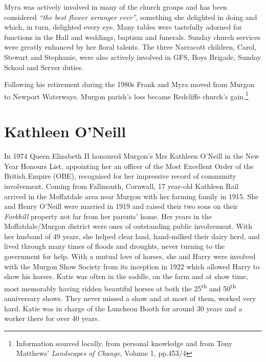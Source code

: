 Myra was actively involved in many of the church groups and has been considered \emph{``the best flower arranger ever''}, something she delighted in doing and which, in turn, delighted every eye. Many tables were tastefully adorned for functions in the Hall and weddings, baptism and funerals. Sunday church services were greatly enhanced by her floral talents. The three Narracott children, Carol, Stewart and Stephanie, were also actively involved in GFS, Boys Brigade, Sunday School and Server duties.



Following his retirement during the 1980s Frank and Myra moved from Murgon to Newport Waterways. Murgon parish's loss became Redcliffe church's gain.\footnote{Information sourced locally, from personal knowledge and from Tony Matthews' \emph{Landscapes of Change}, Volume 1, pp.453/4}


\section{Kathleen O'Neill}



In 1974 Queen Elizabeth II honoured Murgon's Mrs Kathleen O'Neill in the New Year Honours List, appointing her an officer of the Most Excellent Order of the British Empire (OBE), recognised for her impressive record of community involvement. Coming from Fallmouth, Cornwall, 17 year-old Kathleen Rail arrived in the Moffatdale area near Murgon with her farming family in 1915. She and Henry O'Neill were married in 1919 and raised their two sons on their \emph{Forkhill} property not far from her parents' home. Her years in the Moffatdale/Murgon district were ones of outstanding public involvement. With her husband of 49 years, she helped clear land, hand-milked their dairy herd, and lived through many times of floods and droughts, never turning to the government for help. With a mutual love of horses, she and Harry were involved with the Murgon Show Society from its inception in 1922 which allowed Harry to show his horses. Katie was often in the saddle, on the farm and at show time, most memorably having ridden beautiful horses at both the 25\textsuperscript{th} and 50\textsuperscript{th} anniversary shows. They never missed a show and at most of them, worked very hard. Katie was in charge of the Luncheon Booth for around 30 years and a worker there for over 40 years.









